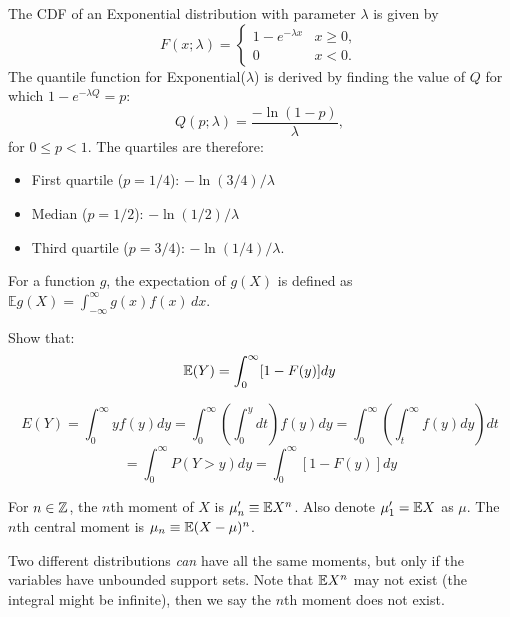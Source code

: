 \documentclass[DIV=14,titlepage=false]{scrreprt}
\begin{document}
\begin{example}
The CDF of an Exponential distribution with parameter \(\lambda\) is given by
  \[
  F(x; \lambda) = 
  \begin{cases} 
  1 - e^{-\lambda x} & x \geq 0, \\
  0 & x < 0.
  \end{cases}
  \]
  The quantile function for Exponential(\(\lambda\)) is derived by finding the value of \(Q\) for which \(1 - e^{-\lambda Q} = p\):
  \[
  Q(p; \lambda) = \frac{-\ln(1 - p)}{\lambda},
  \]
  for \(0 \leq p < 1\). The quartiles are therefore:
  
  \begin{itemize}
    \item First quartile (\(p = 1/4\)): \( -\ln(3/4) / \lambda \)
    \item Median (\(p = 1/2\)): \( -\ln(1/2) / \lambda \)
    \item Third quartile (\(p = 3/4\)): \( -\ln(1/4) / \lambda \).
  \end{itemize}

\end{example}
\vspace{5pt}
\begin{definition}[Expectation]
  For a function \( g \), the expectation of \( g(X) \) is defined as \( \mathbb{E}g(X) = \int_{-\infty}^{\infty} g(x)f(x) \, dx \).
\end{definition}
\vspace{5pt}

\begin{exercise}
  Show that: \[ \mathbb{E}(Y)= \int_{0}^{\infty} [1 - F(y)]dy \]
\end{exercise}
\begin{solution}
  \[E(Y) = \int_{0}^{\infty} yf(y)dy = \int_{0}^{\infty} \left( \int_{0}^{y} dt \right) f(y)dy = \int_{0}^{\infty} \left( \int_{t}^{\infty} f(y)dy \right) dt \] \[ = \int_{0}^{\infty} P(Y > y)dy = \int_{0}^{\infty} [1 - F(y)]dy\]

\end{solution}
\begin{definition}[Moment]
   For $ n \in \mathbb{Z} $, the $ n $th moment of $ X $ is $ \mu_{n}' \equiv \mathbb{E} X^n $. Also denote $ \mu_{1}' = \mathbb{E} X $ as $ \mu $. The $ n $th central moment is $ \mu_n \equiv \mathbb{E}(X - \mu)^n $.
\end{definition}

Two different distributions \textit{can} have all the same moments, but only if the variables have unbounded support sets. Note that $\mathbb{E} X^n$ may not exist (the integral might be infinite), then we say the $n$th moment does not exist.
\end{document}
